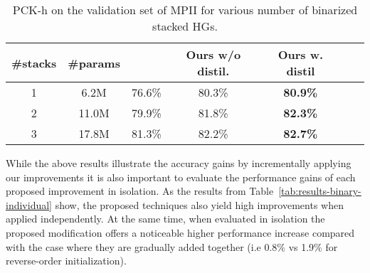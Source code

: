 \documentclass[10pt,twocolumn,letterpaper]{article}
\begin{document}
\begin{table}[!htbp]
\small
	\begin{center}
		\begin{tabular}{|c|c|c|c|c|c|c|}
			\hline
			\#stacks & \#params & \cite{bulat2018hierarchical} & Ours w/o distil. & Ours w. distil \\
			\hline\hline
			  1 & 6.2M & 76.6\%  & 80.3\%&\textbf{80.9\%} \\
			  2 & 11.0M & 79.9\% & 81.8\% & \textbf{82.3\%} \\
			  3 & 17.8M & 81.3\%  & 82.2\% & \textbf{82.7\%} \\
			\hline
		\end{tabular}
	\end{center}
	\caption{PCK-h on the validation set of MPII for various number of binarized stacked HGs.}
	\label{tab:results-binary-stacked}
\end{table}

While the above results illustrate the accuracy gains by incrementally applying our improvements it is also important to evaluate the performance gains of each proposed improvement in isolation. As the results from Table~\ref{tab:results-binary-individual} show, the proposed techniques also yield high improvements when applied independently. At the same time, when evaluated in isolation the proposed modification offers a noticeable higher performance increase  compared with the case where they are gradually added together (i.e 0.8\% vs 1.9\% for reverse-order initialization).
\end{document}
